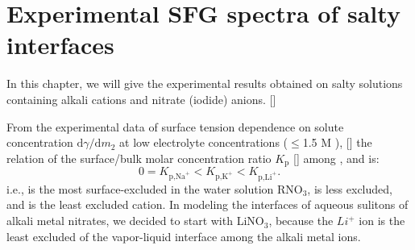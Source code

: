 \chapter{Experimental SFG spectra of salty interfaces}\label{CHAPTER_SFG_Exp}
In this chapter, we will give the experimental results obtained on salty solutions containing alkali cations and nitrate (iodide) anions. [\cite{PS03,AJ12,HuaWei2014}] 

From the experimental data of surface tension dependence on solute concentration $\text{d}\gamma/\text{d}m_2$ 
at low electrolyte concentrations ($\leq$1.5 M ), [\cite{Weissenborn95,Hey81,Jarvis68,Jarvis72}] 
the relation of the surface/bulk molar concentration ratio $K_{\text{p}}$ [\cite{Pegram06}] among \li, \Na and \K is: 
\begin{equation}
0=K_{\text{p,Na}^+}< K_{\text{p,K}^+}< K_{\text{p,Li}^+}.
\label{eq:bscr}
\end{equation}
i.e., \Na is the most surface-excluded in the water solution RNO$_3$, \K is less excluded, 
and \Li is the least excluded cation.
In modeling the interfaces of aqueous sulitons of alkali metal nitrates, we decided to start with LiNO$_3$, because the $Li^+$ ion is the least excluded of the vapor-liquid interface 
among the alkali metal ions. 
%
%


